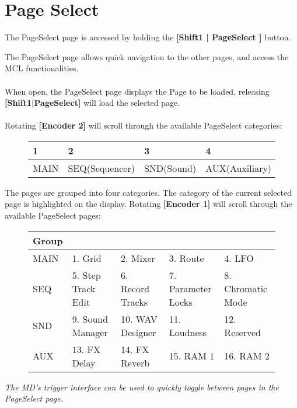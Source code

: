 \chapter{Page Select}
The PageSelect page is accessed by holding the \textbf{[Shift1 | PageSelect ]} button.

The PageSelect page allows quick navigation to the other pages, and access the MCL functionalities.
\\
\\
When open, the PageSelect page displays the Page to be loaded, releasing \textbf{[Shift1|PageSelect]} will load
the selected page.
\\
\\
Rotating \textbf{[Encoder 2]} will scroll through the available PageSelect categories:

\begin{figure}[h]
    \begin{tabular}{|l|l|l|l|}
    \hline
    \rowcolor[HTML]{C0C0C0} 
    1    & 2              & 3          & 4              \\ \hline
    MAIN & SEQ(Sequencer) & SND(Sound) & AUX(Auxiliary) \\ \hline
    \end{tabular}
\end{figure}

The pages are grouped into four categories. The category of the current selected page is highlighted on the display.
Rotating \textbf{[Encoder 1]} will scroll through the available PageSelect pages:

\begin{figure}[h]
    \begin{tabular}{|l|l|l|l|l|}
    \hline
    \rowcolor[HTML]{C0C0C0} 
    {\color[HTML]{000000} Group} & \multicolumn{4}{l|}{\cellcolor[HTML]{C0C0C0}{\color[HTML]{000000} Pages}}      \\ \hline
    MAIN                              & 1. Grid            & 2. Mixer         & 3. Route           & 4. LFO            \\ \hline
    SEQ                               & 5. Step Track Edit & 6. Record Tracks & 7. Parameter Locks & 8. Chromatic Mode \\ \hline
    SND                               & 9. Sound Manager   & 10. WAV Designer & 11. Loudness       & 12. Reserved      \\ \hline
    AUX                               & 13. FX Delay       & 14. FX Reverb    & 15. RAM 1          & 16. RAM 2         \\ \hline
    \end{tabular}
\end{figure}

\textit{The MD's trigger interface can be used to quickly toggle between pages in the PageSelect page. }






